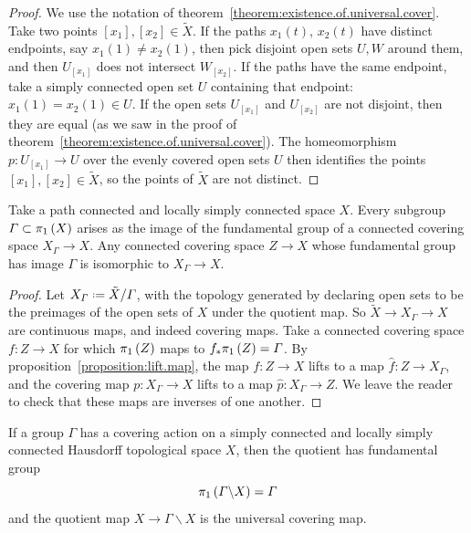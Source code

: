 \begin{proof}
We use the notation of theorem~\vref{theorem:existence.of.universal.cover}.
Take two points \(\left[x_1\right], \left[x_2\right] \in \tilde{X}\).
If the paths \(x_1(t)\), \(x_2(t)\) have distinct endpoints, say \(x_1(1) \ne x_2(1)\), then pick disjoint open sets \(U, W\) around them, and then \(U_{[x_1]}\) does not intersect \(W_{[x_2]}\).
If the paths have the same endpoint, take a simply connected open set \(U\) containing that endpoint: \(x_1(1)=x_2(1) \in U\).
If the open sets \(U_{[x_1]}\) and \(U_{[x_2]}\) are not disjoint, then they are equal (as we saw in the proof of theorem~\ref{theorem:existence.of.universal.cover}).
The homeomorphism \(p \colon U_{[x_1]} \to U\) over the evenly covered open sets \(U\) then identifies the points \([x_1], [x_2] \in \tilde{X}\), so the points of \(\tilde{X}\) are not distinct.
\end{proof}
\begin{lemma}\label{lemma:covering.spaces.and.groups}
Take a path connected and locally simply connected space \(X\).
Every subgroup \(\Gamma \subset \pi_{1}\left(X\right)\) arises as the image of the fundamental group of a connected covering space \(X_{\Gamma} \to X\).
Any connected covering space \(Z \to X\) whose fundamental group has image \(\Gamma\) is isomorphic to \(X_{\Gamma} \to X\).
\end{lemma}
\begin{proof}
Let \(X_{\Gamma}\defeq \tilde{X}/\Gamma\), with the topology generated by declaring open sets to be the preimages of the open sets of \(X\) under the quotient map.
So \(\tilde{X} \to X_{\Gamma} \to X\) are continuous maps, and indeed covering maps.
Take a connected covering space \(f \colon Z \to X\) for which \(\pi_{1}\left(Z\right)\) maps to \(f_* \pi_{1}\left(Z\right) = \Gamma\).
By proposition~\vref{proposition:lift.map}, the map \(f \colon Z \to X\) lifts to a map \(\hat{f} \colon Z \to X_{\Gamma}\), and the covering map \(p \colon X_{\Gamma} \to X\) lifts to a map \(\hat{p} \colon X_{\Gamma} \to Z\).
We leave the reader to check that these maps are inverses of one another.
\end{proof}
\begin{corollary}\label{corollary:quotient.f.g}
If a group \(\Gamma\) has a covering action on a simply connected and locally simply connected Hausdorff topological space \(X\), then the quotient has fundamental group
\[
\pi_{1}\left(\Gamma\backslash X\right)=\Gamma
\]
and the quotient map \(X \to \Gamma\backslash X\) is the universal covering map.
\end{corollary}
